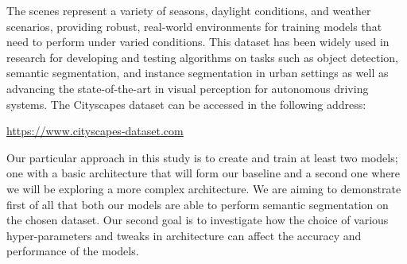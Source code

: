 The scenes represent a variety of seasons, daylight conditions, and weather scenarios, providing robust, real-world environments for training models that need to perform under varied conditions. This dataset has been widely used in research for developing and testing algorithms on tasks such as object detection, semantic segmentation, and instance segmentation in urban settings as well as advancing the state-of-the-art in visual perception for autonomous driving systems. The Cityscapes dataset can be accessed in the following address:
\begin{center}
\url{https://www.cityscapes-dataset.com}
\end{center}
Our particular approach in this study is to create and train at least two models; one with a basic architecture that will form our baseline and a second one where we will be exploring a more complex architecture. We are aiming to demonstrate first of all that both our models are able to perform semantic segmentation on the chosen dataset. Our second goal is to investigate how the choice of various hyper-parameters and tweaks in architecture can affect the accuracy and performance of the models. 

